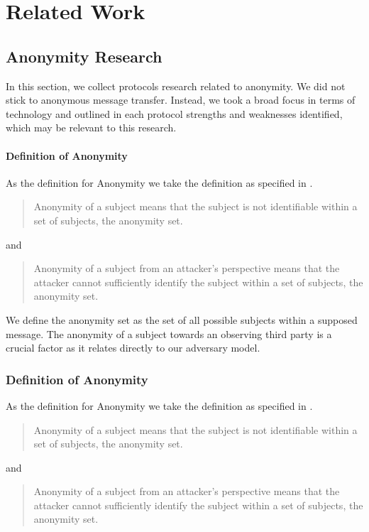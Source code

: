\part{Related Work}
\chapter{Anonymity Research}
In this section, we collect protocols research related to anonymity. We did not stick to anonymous message transfer. Instead, we took a broad focus in terms of technology and outlined in each protocol strengths and weaknesses identified, which may be relevant to this research.

\subsection{Definition of Anonymity}
As the definition for Anonymity we take the definition as specified in \cite{anonTerminology}.
\begin{quote}
	Anonymity of a subject means that the subject is not identifiable within a set of subjects, the anonymity set.\omitted
\end{quote}
and
\begin{quote}
	Anonymity of a subject from an attacker's perspective means that the attacker cannot sufficiently identify the subject within a set of subjects, the anonymity set.\omitted
\end{quote}

We define the anonymity set as the set of all possible subjects within a supposed message. The anonymity of a subject towards an observing third party is a crucial factor as it relates directly to our adversary model.

\section{Definition of Anonymity}
As the definition for Anonymity we take the definition as specified in \cite{anonTerminology}.
\begin{quote}
	Anonymity of a subject means that the subject is not identifiable within a set of subjects, the anonymity set.\omitted
\end{quote}
and
\begin{quote}
	Anonymity of a subject from an attacker's perspective means that the attacker cannot sufficiently identify the subject within a set of subjects, the anonymity set.\omitted
\end{quote}

